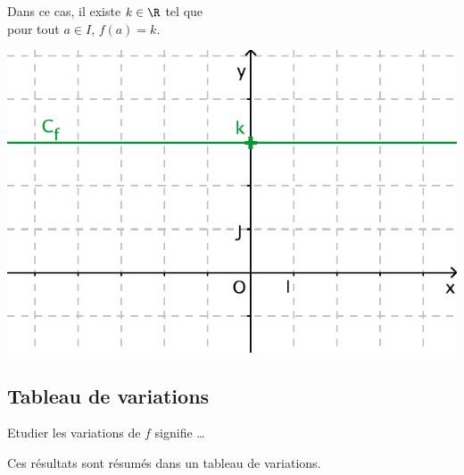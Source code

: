 \begin{minipage}[t]{0.4\linewidth}
  Dans ce cas, il existe $k\in\R$ tel que \\ pour tout $a\in I$, $f(a)=k$.
\end{minipage}
\qquad
\begin{minipage}[c]{0.4\linewidth}
  \includegraphics[width=\textwidth]{F_Constante}
\end{minipage}



\subsection{Tableau de variations}

\og Etudier les variations de $f$ \fg{} signifie {\ldots}


\vspace{2cm}


Ces résultats sont résumés dans un tableau de variations. \\


